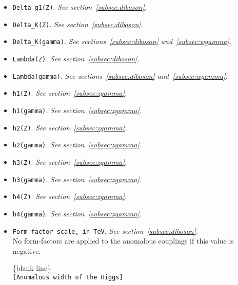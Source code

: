 \documentclass[12pt]{article}
\begin{document}
\begin{itemize}

\begin{center}
\{blank line\} \\
{\tt [Anomalous couplings of the W and Z] }
\end{center}

\item {\tt Delta\_g1(Z)}. {\it See section~\ref{subsec:diboson}.}
\item {\tt Delta\_K(Z)}. {\it See section~\ref{subsec:diboson}.}
\item {\tt Delta\_K(gamma)}. {\it See sections~\ref{subsec:diboson} and~\ref{subsec:wgamma}.}
\item {\tt Lambda(Z)}. {\it See section~\ref{subsec:diboson}.}
\item {\tt Lambda(gamma)}. {\it See sections~\ref{subsec:diboson} and~\ref{subsec:wgamma}.}
\item {\tt h1(Z)}. {\it See section~\ref{subsec:zgamma}.}
\item {\tt h1(gamma)}. {\it See section~\ref{subsec:zgamma}.}
\item {\tt h2(Z)}. {\it See section~\ref{subsec:zgamma}.}
\item {\tt h2(gamma)}. {\it See section~\ref{subsec:zgamma}.}
\item {\tt h3(Z)}. {\it See section~\ref{subsec:zgamma}.}
\item {\tt h3(gamma)}. {\it See section~\ref{subsec:zgamma}.}
\item {\tt h4(Z)}. {\it See section~\ref{subsec:zgamma}.}
\item {\tt h4(gamma)}. {\it See section~\ref{subsec:zgamma}.}
\item {\tt Form-factor scale, in TeV}. {\it See section~\ref{subsec:diboson}.} \\
No form-factors are applied to the anomalous couplings if this value is negative.

\begin{center}
\{blank line\} \\
{\tt [Anomalous width of the Higgs] }
\end{center}


\end{itemize}
\end{document}
